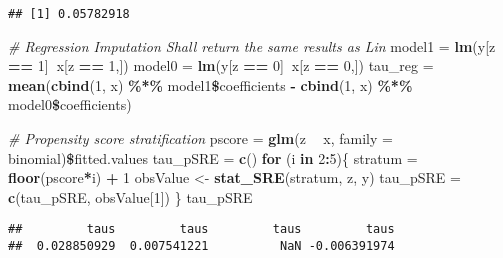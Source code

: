 \documentclass[]{article}
\newenvironment{Shaded}{\begin{snugshade}}{\end{snugshade}}
\newcommand{\KeywordTok}[1]{\textcolor[rgb]{0.13,0.29,0.53}{\textbf{#1}}}
\newcommand{\DataTypeTok}[1]{\textcolor[rgb]{0.13,0.29,0.53}{#1}}
\newcommand{\DecValTok}[1]{\textcolor[rgb]{0.00,0.00,0.81}{#1}}
\newcommand{\StringTok}[1]{\textcolor[rgb]{0.31,0.60,0.02}{#1}}
\newcommand{\CommentTok}[1]{\textcolor[rgb]{0.56,0.35,0.01}{\textit{#1}}}
\newcommand{\ControlFlowTok}[1]{\textcolor[rgb]{0.13,0.29,0.53}{\textbf{#1}}}
\newcommand{\OperatorTok}[1]{\textcolor[rgb]{0.81,0.36,0.00}{\textbf{#1}}}
\newcommand{\NormalTok}[1]{#1}
\begin{document}
\begin{verbatim}
## [1] 0.05782918
\end{verbatim}

\begin{Shaded}
\begin{Highlighting}[]
\CommentTok{# Regression Imputation Shall return the same results as Lin}
\NormalTok{model1 =}\StringTok{ }\KeywordTok{lm}\NormalTok{(y[z }\OperatorTok{==}\StringTok{ }\DecValTok{1}\NormalTok{]}\OperatorTok{~}\NormalTok{x[z }\OperatorTok{==}\StringTok{ }\DecValTok{1}\NormalTok{,])}
\NormalTok{model0 =}\StringTok{ }\KeywordTok{lm}\NormalTok{(y[z }\OperatorTok{==}\StringTok{ }\DecValTok{0}\NormalTok{]}\OperatorTok{~}\NormalTok{x[z }\OperatorTok{==}\StringTok{ }\DecValTok{0}\NormalTok{,])}
\NormalTok{tau_reg =}\StringTok{ }\KeywordTok{mean}\NormalTok{(}\KeywordTok{cbind}\NormalTok{(}\DecValTok{1}\NormalTok{, x) }\OperatorTok{\%*\%}\StringTok{ }\NormalTok{model1}\OperatorTok{\$}\NormalTok{coefficients }\OperatorTok{-}\StringTok{ }\KeywordTok{cbind}\NormalTok{(}\DecValTok{1}\NormalTok{, x) }\OperatorTok{\%*\%}\StringTok{ }\NormalTok{model0}\OperatorTok{\$}\NormalTok{coefficients)}

\CommentTok{# Propensity score stratification}
\NormalTok{pscore =}\StringTok{ }\KeywordTok{glm}\NormalTok{(z }\OperatorTok{~}\StringTok{ }\NormalTok{x, }\DataTypeTok{family =}\NormalTok{ binomial)}\OperatorTok{\$}\NormalTok{fitted.values}
\NormalTok{tau_pSRE =}\StringTok{ }\KeywordTok{c}\NormalTok{()}
\ControlFlowTok{for}\NormalTok{ (i }\ControlFlowTok{in} \DecValTok{2}\OperatorTok{:}\DecValTok{5}\NormalTok{)\{}
\NormalTok{  stratum =}\StringTok{ }\KeywordTok{floor}\NormalTok{(pscore}\OperatorTok{*}\NormalTok{i) }\OperatorTok{+}\StringTok{ }\DecValTok{1}
\NormalTok{  obsValue <-}\StringTok{ }\KeywordTok{stat_SRE}\NormalTok{(stratum, z, y)}
\NormalTok{  tau_pSRE =}\StringTok{ }\KeywordTok{c}\NormalTok{(tau_pSRE, obsValue[}\DecValTok{1}\NormalTok{])}
\NormalTok{\}}
\NormalTok{tau_pSRE}
\end{Highlighting}
\end{Shaded}

\begin{verbatim}
##         taus         taus         taus         taus 
##  0.028850929  0.007541221          NaN -0.006391974
\end{verbatim}
\end{document}
